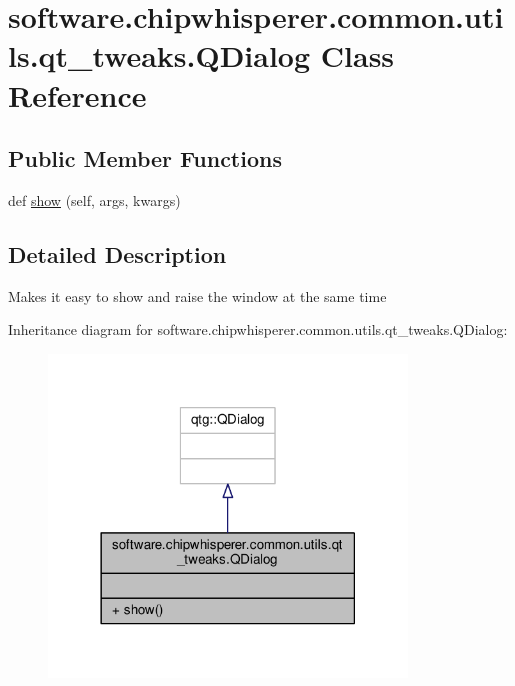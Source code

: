 \hypertarget{classsoftware_1_1chipwhisperer_1_1common_1_1utils_1_1qt__tweaks_1_1QDialog}{}\section{software.\+chipwhisperer.\+common.\+utils.\+qt\+\_\+tweaks.\+Q\+Dialog Class Reference}
\label{classsoftware_1_1chipwhisperer_1_1common_1_1utils_1_1qt__tweaks_1_1QDialog}
\subsection*{Public Member Functions}
\begin{DoxyCompactItemize}
\item 
def \hyperlink{classsoftware_1_1chipwhisperer_1_1common_1_1utils_1_1qt__tweaks_1_1QDialog_a40d5fa80be8258e90cf4a700c4000b96}{show} (self, args, kwargs)
\end{DoxyCompactItemize}


\subsection{Detailed Description}
\begin{DoxyVerb}Makes it easy to show and raise the window at the same time\end{DoxyVerb}
 

Inheritance diagram for software.\+chipwhisperer.\+common.\+utils.\+qt\+\_\+tweaks.\+Q\+Dialog\+:\nopagebreak
\begin{figure}[H]
\begin{center}
\leavevmode
\includegraphics[width=270pt]{d7/dfe/classsoftware_1_1chipwhisperer_1_1common_1_1utils_1_1qt__tweaks_1_1QDialog__inherit__graph}
\end{center}
\end{figure}


